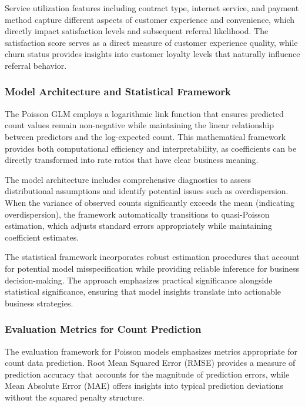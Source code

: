 \documentclass[
]{article}
\begin{document}
Service utilization features including contract type, internet service,
and payment method capture different aspects of customer experience and
convenience, which directly impact satisfaction levels and subsequent
referral likelihood. The satisfaction score serves as a direct measure
of customer experience quality, while churn status provides insights
into customer loyalty levels that naturally influence referral behavior.

\hypertarget{model-architecture-and-statistical-framework}{%
\subsubsection{Model Architecture and Statistical
Framework}\label{model-architecture-and-statistical-framework}}

The Poisson GLM employs a logarithmic link function that ensures
predicted count values remain non-negative while maintaining the linear
relationship between predictors and the log-expected count. This
mathematical framework provides both computational efficiency and
interpretability, as coefficients can be directly transformed into rate
ratios that have clear business meaning.

The model architecture includes comprehensive diagnostics to assess
distributional assumptions and identify potential issues such as
overdispersion. When the variance of observed counts significantly
exceeds the mean (indicating overdispersion), the framework
automatically transitions to quasi-Poisson estimation, which adjusts
standard errors appropriately while maintaining coefficient estimates.

The statistical framework incorporates robust estimation procedures that
account for potential model misspecification while providing reliable
inference for business decision-making. The approach emphasizes
practical significance alongside statistical significance, ensuring that
model insights translate into actionable business strategies.

\hypertarget{evaluation-metrics-for-count-prediction}{%
\subsubsection{Evaluation Metrics for Count
Prediction}\label{evaluation-metrics-for-count-prediction}}

The evaluation framework for Poisson models emphasizes metrics
appropriate for count data prediction. Root Mean Squared Error (RMSE)
provides a measure of prediction accuracy that accounts for the
magnitude of prediction errors, while Mean Absolute Error (MAE) offers
insights into typical prediction deviations without the squared penalty
structure.
\end{document}
